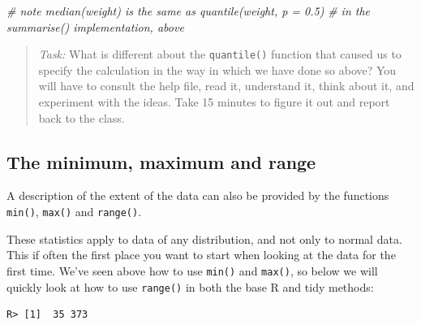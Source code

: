 \documentclass[english,10pt,a4paper,oneside]{book}
\newenvironment{Shaded}{\begin{snugshade}}{\end{snugshade}}
\newcommand{\KeywordTok}[1]{\textcolor[rgb]{0.13,0.29,0.53}{\textbf{#1}}}
\newcommand{\DataTypeTok}[1]{\textcolor[rgb]{0.13,0.29,0.53}{#1}}
\newcommand{\DecValTok}[1]{\textcolor[rgb]{0.00,0.00,0.81}{#1}}
\newcommand{\StringTok}[1]{\textcolor[rgb]{0.31,0.60,0.02}{#1}}
\newcommand{\CommentTok}[1]{\textcolor[rgb]{0.56,0.35,0.01}{\textit{#1}}}
\newcommand{\OperatorTok}[1]{\textcolor[rgb]{0.81,0.36,0.00}{\textbf{#1}}}
\newcommand{\NormalTok}[1]{#1}
\theoremstyle{definition}
\theoremstyle{definition}
\theoremstyle{definition}
\theoremstyle{remark}
\begin{document}
\begin{Shaded}
\begin{Highlighting}[]
\CommentTok{# note median(weight) is the same as quantile(weight, p = 0.5) }
\CommentTok{# in the summarise() implementation, above}
\end{Highlighting}
\end{Shaded}

\begin{quote}
\emph{Task:} What is different about the \texttt{quantile()} function
that caused us to specify the calculation in the way in which we have
done so above? You will have to consult the help file, read it,
understand it, think about it, and experiment with the ideas. Take 15
minutes to figure it out and report back to the class.
\end{quote}

\subsection{The minimum, maximum and
range}\label{the-minimum-maximum-and-range}

A description of the extent of the data can also be provided by the
functions \texttt{min()}, \texttt{max()} and \texttt{range()}.

These statistics apply to data of any distribution, and not only to
normal data. This if often the first place you want to start when
looking at the data for the first time. We've seen above how to use
\texttt{min()} and \texttt{max()}, so below we will quickly look at how
to use \texttt{range()} in both the base R and tidy methods:

\begin{Shaded}
\end{Shaded}

\begin{verbatim}
R> [1]  35 373
\end{verbatim}

\begin{Shaded}
\end{Shaded}
\end{document}
